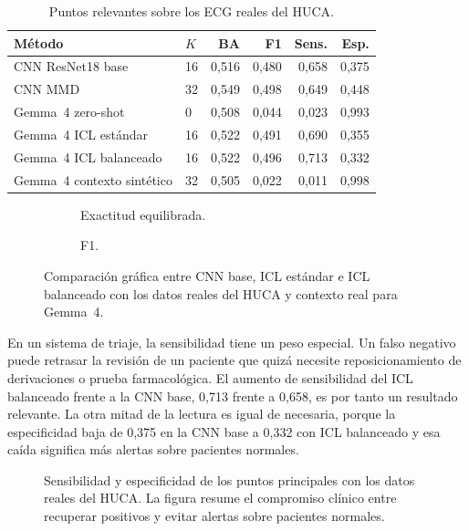 \begin{table}[H]
  \centering
  \footnotesize
  \begin{tabularx}{\textwidth}{p{4.2cm}p{1.4cm}rrrr}
    \toprule
    Método & \(K\) & BA & F1 & Sens. & Esp. \\
    \midrule
    CNN ResNet18 base & 16 & 0,516 & 0,480 & 0,658 & 0,375 \\
    CNN MMD & 32 & 0,549 & 0,498 & 0,649 & 0,448 \\
    Gemma~4 zero-shot & 0 & 0,508 & 0,044 & 0,023 & 0,993 \\
    Gemma~4 ICL estándar & 16 & 0,522 & 0,491 & 0,690 & 0,355 \\
    Gemma~4 ICL balanceado & 16 & 0,522 & 0,496 & 0,713 & 0,332 \\
    Gemma~4 contexto sintético & 32 & 0,505 & 0,022 & 0,011 & 0,998 \\
    \bottomrule
  \end{tabularx}
  \caption{Puntos relevantes sobre los ECG reales del HUCA.}
  \label{tab:comparacion_real}
\end{table}

\begin{figure}[H]
  \centering
  \begin{subfigure}{0.48\textwidth}
    \centering
    \caption{Exactitud equilibrada.}
  \end{subfigure}
  \hfill
  \begin{subfigure}{0.48\textwidth}
    \centering
    \caption{F1.}
  \end{subfigure}
  \caption{Comparación gráfica entre CNN base, ICL estándar e ICL balanceado con los datos reales del HUCA y contexto real para Gemma~4.}
  \label{fig:comparacion_huca_curvas}
\end{figure}

En un sistema de triaje, la sensibilidad tiene un peso especial. Un falso negativo puede retrasar la revisión de un paciente que quizá necesite reposicionamiento de derivaciones o prueba farmacológica. El aumento de sensibilidad del ICL balanceado frente a la CNN base, 0,713 frente a 0,658, es por tanto un resultado relevante. La otra mitad de la lectura es igual de necesaria, porque la especificidad baja de 0,375 en la CNN base a 0,332 con ICL balanceado y esa caída significa más alertas sobre pacientes normales.

\begin{figure}[H]
  \centering
  \caption{Sensibilidad y especificidad de los puntos principales con los datos reales del HUCA. La figura resume el compromiso clínico entre recuperar positivos y evitar alertas sobre pacientes normales.}
  \label{fig:comparacion_huca_sens_spec}
\end{figure}

